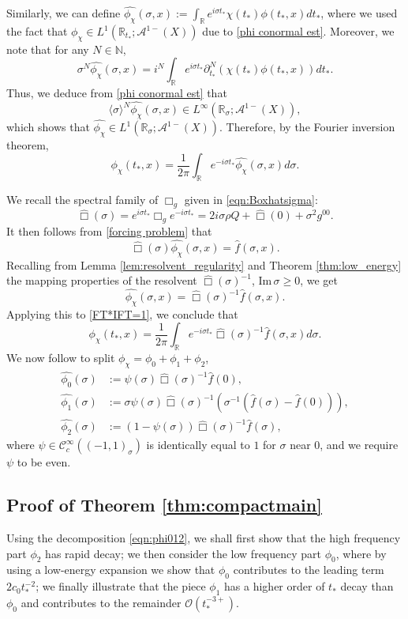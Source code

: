 \documentclass[10pt,a4paper,reqno]{amsart}
\renewcommand{\Im}{\operatorname{Im}}
\newcommand{\CcI}{\mathcal{C}_c^\infty}
\newcommand{\RR}{\mathbb{R}}
\newcommand{\NN}{\mathbb{N}}
\newcommand{\A}{\mathcal{A}}
\newcommand{\pa}{\partial}
\newcommand{\la}{\langle}
\newcommand{\ra}{\rangle}
\let\hat\widehat
\theoremstyle{definition}
\theoremstyle{remark}
\numberwithin{equation}{section}
\renewcommand{\Im}{\mathrm{Im}\,}
\newcommand{\xs}{\sigma}
\newcommand{\R}{\mathbb R}
\newcommand{\ts}{t_*}
\newcommand{\wh}{\widehat}
\begin{document}
Similarly, we can define $\wh{\phi_\chi} (\sigma,x) := \int_\RR e^{i\sigma\ts} \chi(\ts)\phi(\ts,x) d\ts$, where we used the fact that $\phi_\chi \in L^1(\RR_{\ts};\A^{1-}(X))$ due to \eqref{phi conormal est}. Moreover, we note that for any $N\in\NN$,
\[
	\sigma^N \wh{\phi_\chi} (\sigma,x) = i^N \int_\RR e^{i\sigma\ts} \pa_{\ts}^N (\chi(\ts)\phi(\ts,x)) d\ts.
\]
Thus, we deduce from \eqref{phi conormal est} that
\[
	\la\sigma\ra^N \wh{\phi_\chi} (\sigma,x) \in L^\infty(\RR_{\sigma};\A^{1-}(X)),
\]
which shows that $\wh{\phi_\chi} \in L^1(\RR_{\sigma};\A^{1-}(X))$. Therefore, by the Fourier inversion theorem, 
\begin{equation}
\label{FT*IFT=1}
	\phi_\chi(\ts,x) = \frac{1}{2\pi} \int_\RR e^{-i\sigma\ts} \wh{\phi_\chi}(\sigma,x) d\sigma.
\end{equation}

We recall the spectral family of $\Box_g$ given in \eqref{eqn:Boxhatsigma}:
\[
	\wh\Box (\sigma) = e^{i\sigma \ts}\Box_g e^{-i\sigma \ts} = 2i\xs\rho Q + \hat\Box(0) + \xs^2g^{00}.
\]
It then follows from \eqref{forcing problem} that 
\[
	\wh\Box (\sigma) \wh{\phi_\chi} (\sigma,x) = \wh{f}(\sigma,x).
\]  
Recalling from Lemma \ref{lem:resolvent_regularity} and Theorem \ref{thm:low_energy} the mapping properties of the resolvent $\wh\Box (\sigma)^{-1}$, $\Im\sigma\geq 0$, we get
\[
	\wh{\phi_\chi} (\sigma,x) = \wh\Box (\sigma)^{-1} \wh{f}(\sigma,x).
\]
Applying this to \eqref{FT*IFT=1}, we conclude that
\begin{equation}
\label{phichi by IFT}
	\phi_\chi (t_*,x) = \frac{1}{2\pi}\int_{\R} e^{-i\sigma t_*} \wh\Box(\sigma)^{-1} \widehat{f}(\sigma,x) d\sigma.
\end{equation}
We  now follow \cite[Theorem 3.4]{Hin22} to split $\phi_\chi=\phi_0 + \phi_1 + \phi_2$,
\begin{equation}
	\label{eqn:phi012}
	\begin{split}
		\widehat{\phi_0}(\sigma) &:= \psi(\sigma)\wh\Box(\sigma)^{-1} \wh{f}(0), \\
		\widehat{\phi_1}(\sigma) &:= \sigma\psi(\sigma)\wh\Box(\sigma)^{-1}(\sigma^{-1}(\wh{f}(\sigma)-\wh{f}(0))), \\
		\widehat{\phi_2}(\sigma) &:= (1-\psi(\sigma))\wh\Box(\sigma)^{-1}\wh{f}(\sigma),
	\end{split}
\end{equation}
where $\psi\in \CcI((-1,1)_\sigma)$ is identically equal to $1$ for $\sigma$ near $0$, and we require $\psi$ to be even.

\subsection{Proof of Theorem \ref{thm:compactmain}} 
Using the decomposition \eqref{eqn:phi012}, we shall first show that the high frequency part $\phi_2$ has rapid decay; we then consider the low frequency part $\phi_0$, where by using a low-energy expansion we show that $\phi_0$ contributes to the leading term $2c_0\ts^{-2}$; we finally illustrate that the piece $\phi_1$ has a higher order of $\ts$ decay than $\phi_0$ and contributes to the remainder $\mathcal{O}(\ts^{-3+})$.
\end{document}
